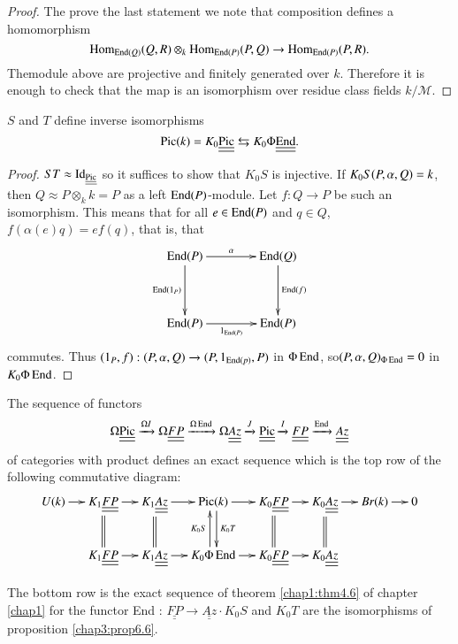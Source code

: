 \begin{proof}%
The prove the last statement we note that composition defines a homomorphism 
$$
\operatorname{Hom}_{\operatorname{End} (Q)} (Q, R) \otimes_k \operatorname{Hom}_{\operatorname{End} (P)} (P, Q) \to \operatorname{Hom}_{\operatorname{End} 
  (P)}(P,R).  
$$
The\pageoriginale module above are projective and finitely generated over
$k$. Therefore it is enough to check that the map is an isomorphism
over residue class fields $k / \mathscr{M}$.  
\end{proof}

\begin{prop}\label{chap3:prop6.6} %
$S$ and $T$ define inverse isomorphisms 
$$
\operatorname{Pic} (k) = K_0 \underline{\underline{\operatorname{Pic}}} \leftrightarrows K_0 \Phi
\underline{\underline{\operatorname{End}}}. 
$$
\end{prop}

\begin{proof}
$ST \approx \operatorname{Id}_{\underline{\underline{\operatorname{Pic}}}}$ so it suffices to show
  that $K_0 S$ is injective. If $K_0 S\break (P, \alpha, Q) = k$, then $Q
  \approx P \otimes_k k = P$ as a left $\operatorname{End} (P)$-module. Let $f : Q
  \to P$ be such an isomorphism. This means that for all $e
  \in \operatorname{End}(P)$ and $q \in Q$, $f (\alpha (e) q) = ef (q)$, that is,
  that   
\[
\xymatrix@=1.4cm{
\End(P) \ar[r]^{\alpha} \ar[d]_{\End (1_P)} & \End (Q) \ar[d]^{\End
  (f)}\\
\End(P) \ar[r]_{1_{\End (P)}} & \End (P)
}
\]
commutes. Thus $(1_P, f): (P, \alpha, Q) \to (P, 1 _{\operatorname{End}(p)}, P)$
in $\Phi \operatorname{End}$, so\break $(P, \alpha, Q)_{\Phi \operatorname{End}} = 0$ in $K_0 \Phi \operatorname{End}$.  
\end{proof}


\setcounter{theorem}{6}
\begin{theorem}\label{chap3:thm6.7}%
The sequence of functors 
$$
\Omega \underline{\underline{\operatorname{Pic}}}\xrightarrow{\Omega I} \Omega
\underline{\underline{FP}} \xrightarrow{\Omega \operatorname{End}} \Omega
\underline{\underline{Az}}\xrightarrow{J}\underline{\underline{\operatorname{Pic}}}
\xrightarrow{I} \underline{\underline{FP}}
\xrightarrow{\operatorname{End}}\underline{\underline{Az}} 
$$ 
of categories with product defines an exact sequence which is the top
row of the following commutative diagram:  
{\fontsize{10pt}{12pt}\selectfont
\[
\xymatrix@C=.45cm{
U(k) \ar[r] & K_1 \underline{\underline{FP}} \ar[r] \ar@{=}[d] & K_1
\underline{\underline{Az}} \ar[r] \ar@{=}[d] & \Pic (k) \ar[r]
\ar@<0.6ex>[d]^{K_0 T} & K_0 \underline{\underline{FP}} \ar[r] \ar@{=}[d] & K_0
\underline{\underline{Az}}  \ar[r] \ar@{=}[d] & Br (k) \ar[r] & 0\\
& K_1 \underline{\underline{FP}} \ar[r] & K_1
\underline{\underline{Az}} \ar[r] & K_0 \Phi \End \ar[r]
\ar@<0.6ex>[u]^{K_0 S}
& K_0 \underline{\underline{FP}} \ar[r] & K_0
\underline{\underline{Az}} & & 
}
\]}\relax

 The bottom row is the exact sequence of theorem \ref{chap1:thm4.6} of
 chapter \ref{chap1} for 
 the functor End : $\underline{\underline{FP}} \to
 \underline{\underline{Az}} \cdot K_0 S$ and $K_0 T$ are the isomorphisms
 of proposition \ref{chap3:prop6.6}.  
\end{theorem}

